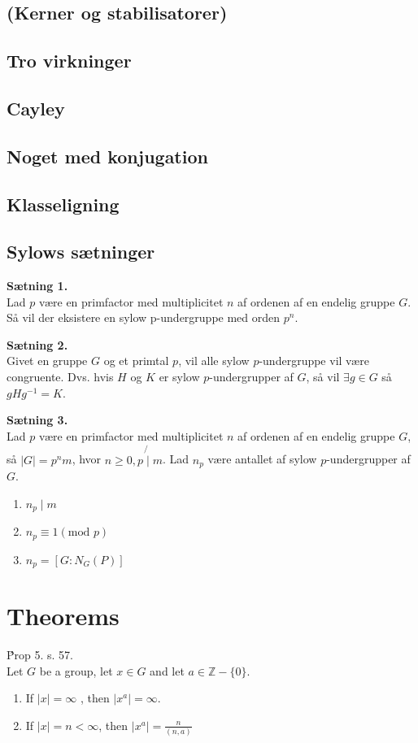 \documentclass[11pt]{article}
\begin{document}
\subsection*{(Kerner og stabilisatorer)}
\subsection*{Tro virkninger}
\subsection*{Cayley}
\subsection*{Noget med konjugation}
\subsection*{Klasseligning}
\subsection*{Sylows sætninger}
\textbf{Sætning 1.}\\
Lad $p$ være en primfactor med multiplicitet $n$ af ordenen af en endelig gruppe $G$. Så vil der eksistere en sylow p-undergruppe med orden $p^n$.

\textbf{Sætning 2.}\\
Givet en gruppe $G$ og et primtal $p$, vil alle sylow $p$-undergruppe vil være congruente. Dvs. hvis $H$ og $K$ er sylow $p$-undergrupper af $G$, så vil $\exists{g \in G}$ så $gHg^{-1} = K$.

\textbf{Sætning 3.}\\
Lad $p$ være en primfactor med multiplicitet $n$ af ordenen af en endelig gruppe $G$, så $|G| = p^n m$, hvor $n \geq 0, p \not{\mid} m$. Lad $n_p$ være antallet af sylow $p$-undergrupper af $G$.
\begin{enumerate}
  \item $n_p \mid m$
  \item $n_p \equiv 1 (\text{mod } p)$
  \item $n_p = [G : N_G(P)]$
\end{enumerate}

\section*{Theorems}

Ṕrop 5. s. 57.\\
Let $G$ be a group, let $x \in G$ and let $a \in \mathbb{Z} - \{0\}$.\\
\begin{enumerate}
  \item If $|x| = \infty$ , then $|x^a| = \infty$.
  \item If $|x| = n < \infty$, then $|x^a| = \frac{n}{(n,a)}$
\end{enumerate}
\end{document}
